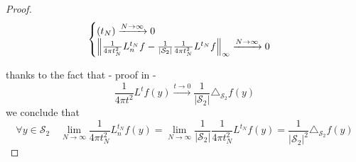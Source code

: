 \begin{proof}
	$$\begin{cases}
	(t_N)\xrightarrow{N\to\infty}0\\
	\left\lVert\frac{1}{4\pi t_N^2}L_n^{t_N}f-\frac{1}{|\mathcal S_2|}\frac{1}{4\pi t_N^2}L^{t_N}f\right\rVert_\infty  \xrightarrow{N\to\infty}0
	\end{cases}$$

	
thanks to the fact that - proof in \cite{Belkin:2005:TTF:2138147.2138189} - 
	$$\frac{1}{4\pi t^2} L^tf(y) \xrightarrow{t\to 0 } \frac{1}{|\mathcal S_2|}\triangle_{\mathcal S_2}f(y)$$
	we conclude that
	$$\forall y\in\mathcal S_2 \quad \lim_{N\to\infty}\frac{1}{4\pi t_N^2} L_n^{t_N}f(y) =  \lim_{N\to\infty}\frac{1}{|\mathcal S_2|}\frac{1}{4\pi t_N^2} L^{t_N}f(y) = \frac{1}{|\mathcal S_2|^2}\triangle_{\mathcal S_2}f(y) $$
\end{proof}
